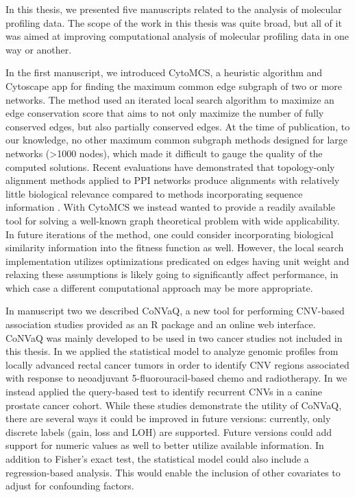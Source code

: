 In this thesis, we presented five manuscripts related to the analysis of molecular profiling data. The scope of the work in this thesis was quite broad, but all of it was aimed at improving computational analysis of molecular profiling data in one way or another.

In the first manuscript, we introduced CytoMCS, a heuristic algorithm and Cytoscape app for finding the maximum common edge subgraph of two or more networks. The method used an iterated local search algorithm to maximize an edge conservation score that aims to not only maximize the number of fully conserved edges, but also partially conserved edges. At the time of publication, to our knowledge, no other maximum common subgraph methods designed for large networks (\textgreater 1000 nodes), which made it difficult to gauge the quality of the computed solutions.
Recent evaluations have demonstrated that topology-only alignment methods applied to PPI networks produce alignments with relatively little biological relevance compared to methods incorporating sequence information \cite{Gligorijevic2015,Malod-Dognin2017}. With CytoMCS we instead wanted to provide a readily available tool for solving a well-known graph theoretical problem with wide applicability. In future iterations of the method, one could consider incorporating biological similarity information into the fitness function as well. However, the local search implementation utilizes optimizations predicated on edges having unit weight and relaxing these assumptions is likely going to significantly affect performance, in which case a different computational approach may be more appropriate.

In manuscript two we described CoNVaQ, a new tool for performing CNV-based association studies provided as an R package and an online web interface.
CoNVaQ was mainly developed to be used in two cancer studies not included in this thesis.
In \citeauthor{Canto2019} \cite{Canto2019} we applied the statistical model to analyze genomic profiles from locally advanced rectal cancer tumors in order to identify CNV regions associated with response to neoadjuvant 5-fluorouracil-based chemo and radiotherapy.
In \citeauthor{Laufer-Amorim2019} \cite{Laufer-Amorim2019} we instead applied the query-based test to identify recurrent CNVs in a canine prostate cancer cohort.
While these studies demonstrate the utility of CoNVaQ, there are several ways it could be improved in future versions: currently, only discrete labels (gain, loss and LOH) are supported. Future versions could add support for numeric values as well to better utilize available information. In addition to Fisher's exact test, the statistical model could also include a regression-based analysis. This would enable the inclusion of other covariates to adjust for confounding factors.

